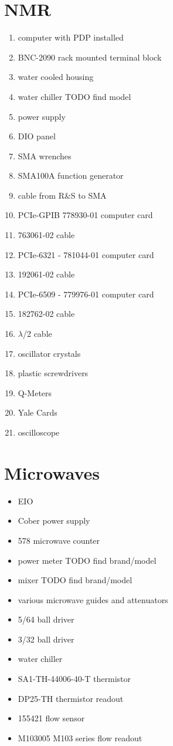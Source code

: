 \section{NMR}
\begin{enumerate}
\item computer with PDP installed
\item {} BNC-2090 rack mounted terminal block
\item water cooled housing
\item water chiller TODO find model
\item power supply
\item DIO panel
 \item SMA wrenches
\item {}  SMA100A function generator
\item cable from R\&S to SMA
\item {} PCIe-GPIB 778930-01 computer card
\item {}763061-02 cable
\item {} PCIe-6321 - 781044-01 computer card
\item {} 192061-02 cable
\item {} PCIe-6509 - 779976-01 computer card
\item {} 182762-02 cable
\item $\lambda$/2 cable
\item oscillator crystals
\item plastic screwdrivers
\item Q-Meters
\item Yale Cards
\item oscilloscope
\end{enumerate}


\section{Microwaves}
\begin{itemize}
 \item EIO
\item Cober power supply
\item {} 578 microwave counter
\item power meter TODO find brand/model
\item mixer TODO find brand/model
\item various microwave guides and attenuators
\item 5/64\inches{} ball driver
\item 3/32\inches{} ball driver
\item water chiller
\item {} SA1-TH-44006-40-T thermistor
\item {} DP25-TH thermistor readout
\item {} 155421 flow sensor
\item {} M103005  M103 series flow readout
\end{itemize}
